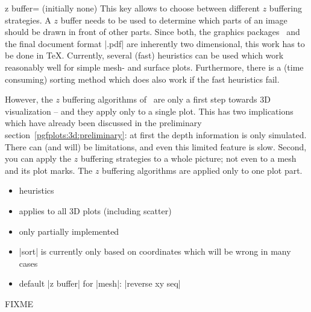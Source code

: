 \begin{pgfplotskey}{z buffer= (initially none)}
	This key allows to choose between different $z$ buffering strategies. A $z$ buffer needs to be used to determine which parts of an image should be drawn in front of other parts. Since both, the graphics packages \PGF\ and the final document format |.pdf| are inherently two dimensional, this work has to be done in \TeX. Currently, several (fast) heuristics can be used which work reasonably well for simple mesh- and surface plots. Furthermore, there is a (time consuming) sorting method which does also work if the fast heuristics fail.

	However, the $z$ buffering algorithms of \PGFPlots\ are only a first step towards 3D visualization -- and they apply only to a single plot. This has two implications which have already been discussed in the preliminary section~\ref{pgfplots:3d:preliminary}: at first the depth information is only simulated. There can (and will) be limitations, and even this limited feature is slow. Second, you can apply the $z$ buffering strategies to a whole picture; not even to a mesh and its plot marks. The $z$ buffering algorithms are applied only to one plot part.

	\begin{itemize}
		\item heuristics
		\item applies to all 3D plots (including scatter)
		\item only partially implemented
		\item |sort| is currently only based on coordinates which will be wrong in many cases
		\item default |z buffer| for |mesh|: |reverse xy seq|
	\end{itemize}
	FIXME
\end{pgfplotskey}

